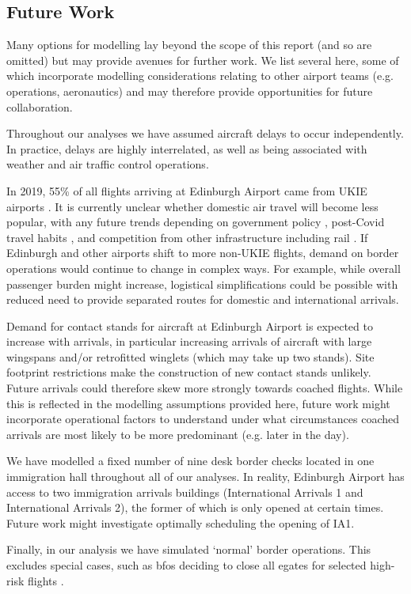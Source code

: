 \documentclass[10pt]{article}
\begin{document}
\subsection{Future Work}
Many options for modelling lay beyond the scope of this report (and so are omitted) but may provide avenues for further work. We list several here, some of which incorporate modelling considerations relating to other airport teams (e.g. operations, aeronautics) and may therefore provide opportunities for future collaboration.

Throughout our analyses we have assumed aircraft delays to occur independently. In practice, delays are highly interrelated, as well as being associated with weather and air traffic control operations.

In 2019, 55\% of all flights arriving at Edinburgh Airport came from UKIE airports \cite{noise_lab}. It is currently unclear whether domestic air travel will become less popular, with any future trends depending on government policy \cite{flight_tax_independent}, post-Covid travel habits \cite{post_covid_flights}, and competition from other infrastructure including rail \cite{train_airplane_guardian}. If Edinburgh and other airports shift to more non-UKIE flights, demand on border operations would continue to change in complex ways. For example, while overall passenger burden might increase, logistical simplifications could be possible with reduced need to provide separated routes for domestic and international arrivals.

Demand for contact stands for aircraft at Edinburgh Airport is expected to increase with arrivals, in particular increasing arrivals of aircraft with large wingspans and/or retrofitted winglets (which may take up two stands). Site footprint restrictions make the construction of new contact stands unlikely. Future arrivals could therefore skew more strongly towards coached flights. While this is reflected in the modelling assumptions provided here, future work might incorporate operational factors to understand under what circumstances coached arrivals are most likely to be more predominant (e.g. later in the day). 

We have modelled a fixed number of nine desk border checks located in one immigration hall throughout all of our analyses. In reality, Edinburgh Airport has access to two immigration arrivals buildings (International Arrivals 1 and International Arrivals 2), the former of which is only opened at certain times. Future work might investigate optimally scheduling the opening of IA1.

Finally, in our analysis we have simulated `normal' border operations. This excludes special cases, such as \glspl{bfo} deciding to close all \glspl{egate} for selected high-risk flights \cite{Inspection_eGates}. 

\newpage
{\footnotesize
}
% 
\end{document}
